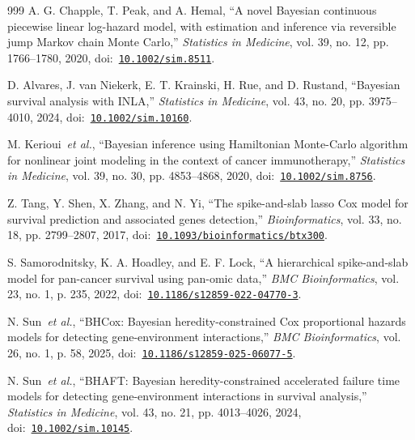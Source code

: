 \begin{thebibliography}{999}
\def\currentbiburl{https://doi.org/10.1002/sim.8511}
 A. G. Chapple, T. Peak, and A. Hemal, ``A novel Bayesian continuous piecewise linear log-hazard model, with estimation and inference via reversible jump Markov chain Monte Carlo,'' \emph{Statistics in Medicine}, vol. 39, no. 12, pp. 1766--1780, 2020, doi:~\href{https://doi.org/10.1002/sim.8511}{\nolinkurl{10.1002/sim.8511}}.

\def\currentbiburl{https://doi.org/10.1002/sim.10160}
 D. Alvares, J. van Niekerk, E. T. Krainski, H. Rue, and D. Rustand, ``Bayesian survival analysis with INLA,'' \emph{Statistics in Medicine}, vol. 43, no. 20, pp. 3975--4010, 2024, doi:~\href{https://doi.org/10.1002/sim.10160}{\nolinkurl{10.1002/sim.10160}}.

\def\currentbiburl{https://doi.org/10.1002/sim.8756}
 M. Kerioui~\emph{et al.}, ``Bayesian inference using Hamiltonian Monte-Carlo algorithm for nonlinear joint modeling in the context of cancer immunotherapy,'' \emph{Statistics in Medicine}, vol. 39, no. 30, pp. 4853--4868, 2020, doi:~\href{https://doi.org/10.1002/sim.8756}{\nolinkurl{10.1002/sim.8756}}.

\def\currentbiburl{https://doi.org/10.1093/bioinformatics/btx300}
 Z. Tang, Y. Shen, X. Zhang, and N. Yi, ``The spike-and-slab lasso Cox model for survival prediction and associated genes detection,'' \emph{Bioinformatics}, vol. 33, no. 18, pp. 2799--2807, 2017, doi:~\href{https://doi.org/10.1093/bioinformatics/btx300}{\nolinkurl{10.1093/bioinformatics/btx300}}.

\def\currentbiburl{https://doi.org/10.1186/s12859-022-04770-3}
 S. Samorodnitsky, K. A. Hoadley, and E. F. Lock, ``A hierarchical spike-and-slab model for pan-cancer survival using pan-omic data,'' \emph{BMC Bioinformatics}, vol. 23, no. 1, p. 235, 2022, doi:~\href{https://doi.org/10.1186/s12859-022-04770-3}{\nolinkurl{10.1186/s12859-022-04770-3}}.

\def\currentbiburl{https://doi.org/10.1186/s12859-025-06077-5}
 N. Sun~\emph{et al.}, ``BHCox: Bayesian heredity-constrained Cox proportional hazards models for detecting gene-environment interactions,'' \emph{BMC Bioinformatics}, vol. 26, no. 1, p. 58, 2025, doi:~\href{https://doi.org/10.1186/s12859-025-06077-5}{\nolinkurl{10.1186/s12859-025-06077-5}}.

\def\currentbiburl{https://doi.org/10.1002/sim.10145}
 N. Sun~\emph{et al.}, ``BHAFT: Bayesian heredity-constrained accelerated failure time models for detecting gene-environment interactions in survival analysis,'' \emph{Statistics in Medicine}, vol. 43, no. 21, pp. 4013--4026, 2024, doi:~\href{https://doi.org/10.1002/sim.10145}{\nolinkurl{10.1002/sim.10145}}.


\end{thebibliography}
